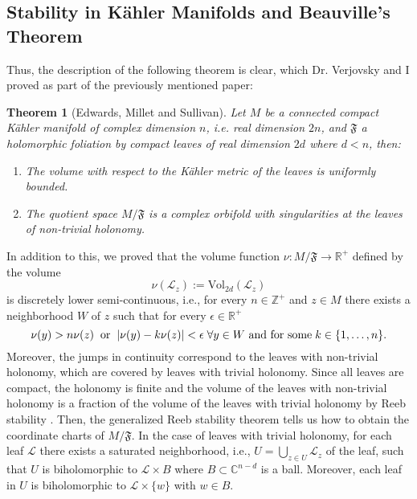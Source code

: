 \documentclass[12pt,twoside,a4paper]{report}
\newtheorem{theorem}{Theorem}[section]
\newcommand{\zah}{\ensuremath{ \mathbb Z }}
\newcommand{\co}{\ensuremath{\mathbb C }}
\newcommand{\re}{\ensuremath{\mathbb R }}
\begin{document}
\subsection{Stability in K\"ahler Manifolds and Beauville's Theorem}

\noindent Thus, the description of the following theorem is clear, which Dr. Verjovsky and I proved as part of the previously mentioned paper:
\begin{theorem}[Edwards, Millet and Sullivan]\label{EMS}
        Let $M$ be a connected compact K\"ahler manifold of complex dimension $n$, i.e. real dimension $2n$, and $\mathfrak{F}$ a holomorphic foliation by compact
        leaves of real dimension $2d$ where $d<n$, then:
        \begin{enumerate}
                \item[a)] The volume with respect to the K\"ahler metric of the leaves is uniformly bounded.
                \item[b)] The quotient space $M/\mathfrak{F}$ is a complex orbifold with singularities at the leaves of non-trivial holonomy.
        \end{enumerate}
\end{theorem}
In addition to this, we proved that the volume function $\nu:M/\mathfrak{F}\rightarrow\re^{+}$ defined by the volume
\[
        \nu(\mathcal{L}_z):=\textrm{Vol}_{2d}(\mathcal{L}_z)
\]
is discretely lower semi-continuous, i.e., for every $n\in\zah^{+}$ and $z\in M$ there exists a neighborhood $W$ of $z$
such that for every $\epsilon\in\re^{+}$
\[
        \nu(y)>n\nu(z)\hspace{0.2cm}\text{or}\hspace{0.2cm}|\nu(y)-k\nu(z)|<\epsilon\hspace{0.1cm}\forall y\in W\text{ and for some}\hspace{0.1cm}k\in\{1,\dots,n\}.
\]
\noindent Moreover, the jumps in continuity correspond to the leaves with non-trivial holonomy, which are covered
by leaves with trivial holonomy. Since all leaves are compact, the holonomy is finite and the volume of the leaves
with non-trivial holonomy is a fraction of the volume of the leaves with trivial holonomy by Reeb stability \cite{Thurston}.
Then, the generalized Reeb stability theorem \cite{Thurston} tells us how to obtain the coordinate charts of $M/\mathfrak{F}$.
In the case of leaves with trivial holonomy, for each leaf $\mathcal{L}$ there exists a saturated neighborhood, i.e., $U=\bigcup_{z\in U}\mathcal{L}_z$ of the leaf,
such that $U$ is biholomorphic to $\mathcal{L}\times B$ where $B\subset\co^{n-d}$ is a ball. Moreover, each leaf in $U$ is biholomorphic to $\mathcal{L}\times\{w\}$ with $w\in B$.
\end{document}
